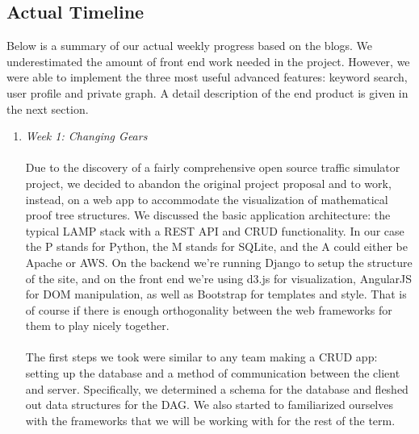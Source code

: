 \documentclass{acm_proc_article-sp}
\begin{document}
\subsection{Actual Timeline}
Below is a summary of our actual weekly progress based on the blogs. We underestimated the amount of front end work needed in the project. However, we were able to implement the three most useful advanced features: keyword search, user profile and private graph. A detail description of the end product is given in the next section.
\begin{enumerate}
\item \emph{Week 1:  Changing Gears}\\\\
Due to the discovery of a fairly comprehensive open source traffic simulator project, we decided to abandon the original project proposal and to work, instead, on a web app to accommodate the visualization of mathematical proof tree structures. We discussed the basic application architecture: the typical LAMP stack with a REST API and CRUD functionality. In our case the P stands for Python, the M stands for SQLite, and the A could either be Apache or AWS. On the backend we're running Django to setup the structure of the site, and on the front end we're using d3.js for visualization, AngularJS for DOM manipulation, as well as Bootstrap for templates and style. That is of course if there is enough orthogonality between the web frameworks for them to play nicely together.\\\\
The first steps we took were similar to any team making a CRUD app: setting up the database and a method of communication between the client and server. Specifically, we determined a schema for the database and fleshed out data structures for the DAG. We also started to familiarized ourselves with the frameworks that we will be working with for the rest of the term.\\\\


\end{enumerate}
\end{document}
